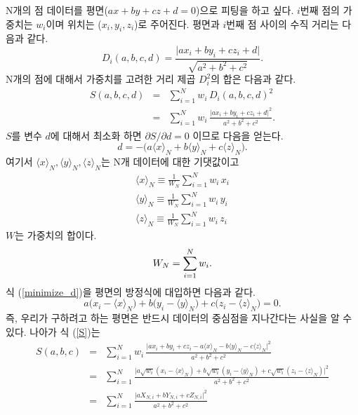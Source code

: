 \documentclass[chapter,a4paper,10pt]{oblivoir}
\begin{document}
N개의 점 데이터를 평면($ax+by+cz+d=0$)으로 피팅을 하고 싶다. $i$번째 점의 가중치는 $w_i$이며 위치는 ($x_i, y_i, z_i$)로 주어진다.
평면과 $i$번째 점 사이의 수직 거리는 다음과 같다.
\begin{equation}
D_i(a,b,c,d) = \frac{\vert ax_i + by_i + cz_i + d \vert}{\sqrt{a^2 + b^2 + c^2}}.
\end{equation}
N개의 점에 대해서 가중치를 고려한 거리 제곱 $D_i^2$의 합은 다음과 같다.
\begin{eqnarray} \label{S}
S(a,b,c,d) &=& \sum_{i=1}^N w_i\, D_i(a,b,c,d)^2 \\\nonumber
&=& \sum_{i=1}^N w_i\, \frac{\vert ax_i + by_i + cz_i + d \vert^2}{a^2 + b^2 + c^2}.
\end{eqnarray}
$S$를 변수 $d$에 대해서 최소화 하면 ${\partial S}/{\partial d} = 0$ 이므로 다음을 얻는다.
\begin{equation} \label{minimize_d}
d = -\Big(a\langle x \rangle_N + b\langle y \rangle_N + c\langle z \rangle_N\Big).
\end{equation}
여기서 $\langle x \rangle_N, \langle y \rangle_N, \langle z \rangle_N$는 N개 데이터에 대한 기댓값이고
\begin{eqnarray} \label{expectation_value}
\langle x \rangle_N \equiv \frac{1}{W_N}\sum_{i=1}^N w_i\,x_i\\
\langle y \rangle_N \equiv \frac{1}{W_N}\sum_{i=1}^N w_i\,y_i\\
\langle z \rangle_N \equiv \frac{1}{W_N}\sum_{i=1}^N w_i\,z_i
\end{eqnarray}
$W$는 가중치의 합이다.
\begin{equation} \label{W}
W_N = \sum_{i=1}^N w_i. \\
\end{equation}
식 (\ref{minimize_d})을 평면의 방정식에 대입하면 다음과 같다.
\begin{equation}
a\big(x_i-\langle x \rangle_N\big) + b\big(y_i-\langle y \rangle_N\big) + c\big(z_i-\langle z \rangle_N\big) = 0.
\end{equation}
즉, 우리가 구하려고 하는 평면은 반드시 데이터의 중심점을 지나간다는 사실을 알 수 있다.
나아가 식 (\ref{S})는
\begin{eqnarray} \label{S2}
S(a,b,c)
&=& \sum_{i=1}^N w_i\, \frac{\vert ax_i + by_i + cz_i - a\langle x \rangle_N - b\langle y \rangle_N - c\langle z \rangle_N \vert^2}{a^2 + b^2 + c^2} \\
&=& \sum_{i=1}^N \frac{\vert a \sqrt{w_i}(x_i-\langle x \rangle_N) + b \sqrt{w_i}(y_i-\langle y \rangle_N) + c \sqrt{w_i}(z_i-\langle z \rangle_N) \vert^2}{a^2 + b^2 + c^2} \nonumber\\
&=& \sum_{i=1}^N \frac{\vert aX_{N,i} + bY_{N,i} + cZ_{N,i} \vert^2}{a^2 + b^2 + c^2} \nonumber
\end{eqnarray}
\end{document}
